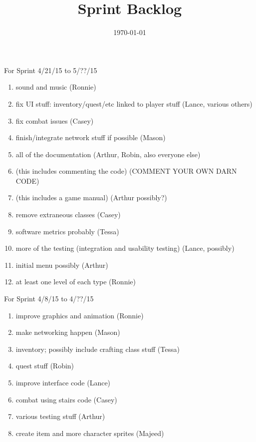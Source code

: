 \documentclass[12pt]{article}
\title{Sprint Backlog}
\date{\today}
\begin{document}
\maketitle



\begin{section}{For Sprint 4/21/15 to 5/??/15}
\begin{enumerate}

\item sound and music (Ronnie)
\item fix UI stuff: inventory/quest/etc linked to player stuff (Lance, various others)
\item fix combat issues (Casey)
\item finish/integrate network stuff if possible (Mason)
\item all of the documentation (Arthur, Robin, also everyone else)
\item (this includes commenting the code) (COMMENT YOUR OWN DARN CODE) 
\item (this includes a game manual) (Arthur possibly?)
\item remove extraneous classes (Casey)

\item software metrics probably (Tessa)
\item more of the testing (integration and usability testing) (Lance, possibly) 
\item initial menu possibly (Arthur)
\item at least one level of each type (Ronnie) 


\end{enumerate}
\end{section}






\begin{section}{For Sprint 4/8/15 to 4/??/15}
\begin{enumerate}


\item improve graphics and animation (Ronnie)
\item make networking happen (Mason) 
\item inventory; possibly include crafting class stuff (Tessa) 
\item quest stuff (Robin)
\item improve interface code (Lance)
\item combat using stairs code (Casey)
\item various testing stuff (Arthur)
\item create item and more character sprites (Majeed)


\end{enumerate}
\end{section}
\end{document}
